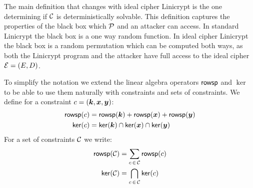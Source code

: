 The main definition that changes with ideal cipher Linicrypt is the one determining if $\C$ is deterministically solvable.
This definition captures the properties of the black box which $\P$ and an attacker can access.
In standard Linicrypt the black box is a one way random function.
In ideal cipher Linicrypt the black box is a random permutation which can be computed both ways,
as both the Linicrypt program and the attacker have full access to the ideal cipher $\mathcal{E} = (\E,\D)$.

To simplify the notation we extend the linear algebra operators $\rowsp$ and $\ker$
to be able to use them naturally with constraints and sets of constraints.
We define for a constraint $c = (\vk, \vx, \vy)$:
\begin{align*}
\rowsp(c) &= \rowsp(\vk) + \rowsp(\vx) + \rowsp(\vy) \\
\ker(c) &= \ker(\vk) \cap \ker(\vx) \cap \ker(\vy)
\end{align*}
For a set of constraints $\C$ we write:
\begin{align*}
\rowsp(\C) &= \sum_{c \, \in \, \C} \rowsp(c) \\
\ker(\C) &= \bigcap_{c \, \in \, \C} \ker(c)
\end{align*}


